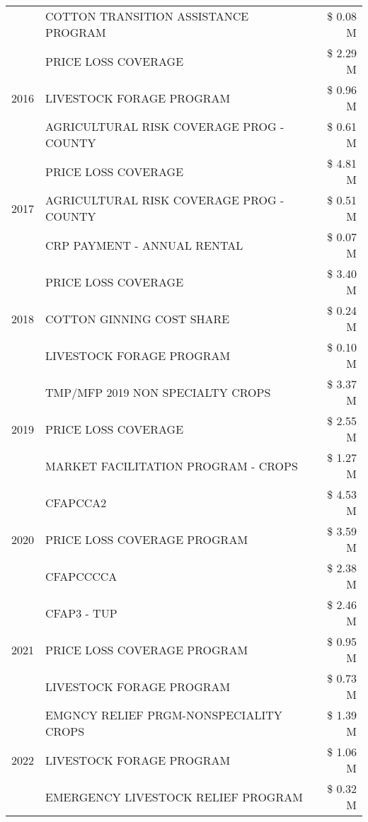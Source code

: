 \begin{tabular}{llr}
 & COTTON TRANSITION ASSISTANCE PROGRAM & \$ 0.08 M \\
\cline{1-3}
\multirow[t]{3}{*}{2016} & PRICE LOSS COVERAGE & \$ 2.29 M \\
 & LIVESTOCK FORAGE PROGRAM & \$ 0.96 M \\
 & AGRICULTURAL RISK COVERAGE PROG - COUNTY & \$ 0.61 M \\
\cline{1-3}
\multirow[t]{3}{*}{2017} & PRICE LOSS COVERAGE & \$ 4.81 M \\
 & AGRICULTURAL RISK COVERAGE PROG - COUNTY & \$ 0.51 M \\
 & CRP PAYMENT - ANNUAL RENTAL & \$ 0.07 M \\
\cline{1-3}
\multirow[t]{3}{*}{2018} & PRICE LOSS COVERAGE & \$ 3.40 M \\
 & COTTON GINNING COST SHARE & \$ 0.24 M \\
 & LIVESTOCK FORAGE PROGRAM & \$ 0.10 M \\
\cline{1-3}
\multirow[t]{3}{*}{2019} & TMP/MFP 2019 NON SPECIALTY CROPS & \$ 3.37 M \\
 & PRICE LOSS COVERAGE & \$ 2.55 M \\
 & MARKET FACILITATION PROGRAM - CROPS & \$ 1.27 M \\
\cline{1-3}
\multirow[t]{3}{*}{2020} & CFAPCCA2 & \$ 4.53 M \\
 & PRICE LOSS COVERAGE PROGRAM & \$ 3.59 M \\
 & CFAPCCCCA & \$ 2.38 M \\
\cline{1-3}
\multirow[t]{3}{*}{2021} & CFAP3 - TUP & \$ 2.46 M \\
 & PRICE LOSS COVERAGE PROGRAM & \$ 0.95 M \\
 & LIVESTOCK FORAGE PROGRAM & \$ 0.73 M \\
\cline{1-3}
\multirow[t]{3}{*}{2022} & EMGNCY RELIEF PRGM-NONSPECIALITY CROPS & \$ 1.39 M \\
 & LIVESTOCK FORAGE PROGRAM & \$ 1.06 M \\
 & EMERGENCY LIVESTOCK RELIEF PROGRAM & \$ 0.32 M \\
\cline{1-3}
\bottomrule
\end{tabular}
